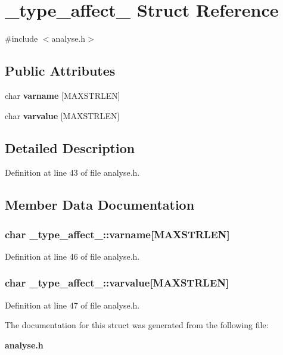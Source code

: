 \section{\_\-type\_\-affect\_\- Struct Reference}
\label{struct__type__affect__}


{\ttfamily \#include $<$analyse.h$>$}\subsection*{Public Attributes}
\begin{DoxyCompactItemize}
\item 
char {\bf varname} [MAXSTRLEN]
\item 
char {\bf varvalue} [MAXSTRLEN]
\end{DoxyCompactItemize}


\subsection{Detailed Description}


Definition at line 43 of file analyse.h.

\subsection{Member Data Documentation}
\subsubsection[{varname}]{\setlength{\rightskip}{0pt plus 5cm}char {\bf \_\-type\_\-affect\_\-::varname}[MAXSTRLEN]}\label{struct__type__affect___a1edec9e19577f677c93b01add5342530}


Definition at line 46 of file analyse.h.
\subsubsection[{varvalue}]{\setlength{\rightskip}{0pt plus 5cm}char {\bf \_\-type\_\-affect\_\-::varvalue}[MAXSTRLEN]}\label{struct__type__affect___ac29b2106e4535a40d6008dfefc4ccce3}


Definition at line 47 of file analyse.h.

The documentation for this struct was generated from the following file:\begin{DoxyCompactItemize}
\item 
{\bf analyse.h}\end{DoxyCompactItemize}

